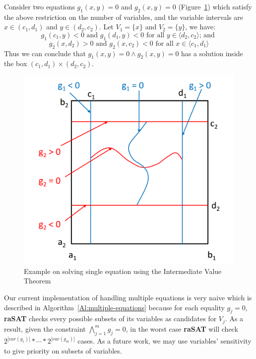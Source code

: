 \documentclass[runningheads,a4paper,oribibl]{llncs}
\begin{document}
\begin{example}
Consider two equations $g_1(x, y)=0$ and $g_2(x, y) = 0$ (Figure~\ref{fig:multiple-equations}) which satisfy the above restriction on the number of variables, and the variable intervals are $x \in (c_1, d_1)$ and $y \in(d_2, c_2)$. Let $V_1 = \{x\}$ and $V_2 = \{y\}$, we have:
\[g_1(c_1, y) < 0\text{ and }g_1(d_1, y) < 0 \text{ for all } y \in \langle d_2, c_2 \rangle \text{; and }\]
\[g_2(x, d_2) > 0 \text{ and }g_2(x, c_2) < 0 \text{ for all } x \in \langle c_1, d_1 \rangle\]
Thus we can conclude that $g_1(x,y)=0 \wedge g_2(x,y)=0$ has a solution inside the box $(c_1, d_1) \times (d_2, c_2)$.
\end{example}
\begin{figure}[ht]
\centering
\includegraphics[scale=0.4]{multipleEquations.png} 
\caption{Example on solving single equation using the Intermediate Value Theorem} 
\label{fig:multiple-equations} 
\end{figure}
Our current implementation of handling multiple equations is very naive
which is described in Algorithm~\ref{Al:multiple-equations}
because for each equality $g_j = 0$, \textbf{raSAT} checks every possible subsets of its variables as candidates for $V_j$. As a result, given the constraint $\bigwedge\limits_{j=1}^mg_j=0$, in the worst case \textbf{raSAT} will check $2^{|var(g_1)|}*\cdots*2^{|var(g_m)|}$ cases. As a future work, we may use variables' sensitivity to give priority on subsets of variables.
\end{document}
